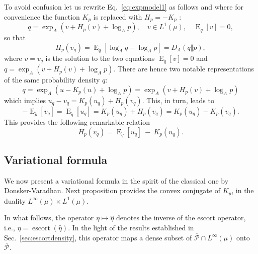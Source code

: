 \documentclass[graybox]{svmult}
\DeclareMathOperator{\Expectation}{E}
\newcommand{\escortof}[1]{\operatorname{escort}\left(#1\right)}
\begin{document}
To avoid confusion let us rewrite Eq.~\eqref{eq:expmodel1} as follows and where for convenience the function $K_p$ is replaced with $H_p=-K_p$ : \begin{equation}
q=\exp _{A}(v+H_{p}(v)+\log _{A}p), \quad v\in L^{1}(\mu ),\quad {\Expectation}_{
\widetilde{q}}\left[ v\right] =0,  \label{eq:expmodel2}
\end{equation}
so that 
\begin{equation*}
H_{p}(v_q) ={\Expectation}_{\widetilde{q}}\left[ \log _{A}q-\log _{A}p\right]
=D_{A}(q\Vert p),
\end{equation*}
where $v=v_q$ is the solution to the two equations   ${\Expectation}_{\widetilde{q}}\left[ v\right] =0$ and 
$q=\exp _{A}(v+H_{p}(v)+\log _{A}p)$.
There are hence two notable representations of the same probability density $q$: 
\begin{equation*}
q=\exp_A(u - K_p(u) + \log_A p) = \exp_A(v + H_p(v) + \log_A p)
\end{equation*}
which implies $u_q - v_q = K_p(u_q) + H_p(v_q)$. This, in turn, leads to 
\begin{equation*} 
- {\Expectation}_{\widetilde p}\left[v_q \right] = {\Expectation}_{\widetilde q}\left[u_q \right] =
K_p(u_q)+H_p(v_q)=K_p(u_q)-K_p(v_q).
\end{equation*}
This provides the following remarkable relation
\begin{equation}  \label{eq:conjugate}
H_p(v_q)={\Expectation}_{\widetilde q}\left[u_q \right]\ -\ K_p(u_q).
\end{equation}


\subsection{Variational formula}
We now present a variational formula in the spirit of the classical one by
Donsker-Varadhan. Next proposition provides 
the convex
conjugate of $K_{p}$, in the duality $L^{\infty }(\mu )\times L^{1}(\mu )$.

In what follows, the operator $\eta \mapsto \hat{\eta}$ denotes
the inverse of the escort operator, i.e., $\eta = \escortof {\hat \eta}$. In the light of the results established in Sec.~\ref{sec:escortdensity}, this operator maps a dense subset of $\overline{\mathcal P}\cap L^{\infty}(\mu)$ onto $\overline{\mathcal P}$.  
\end{document}
